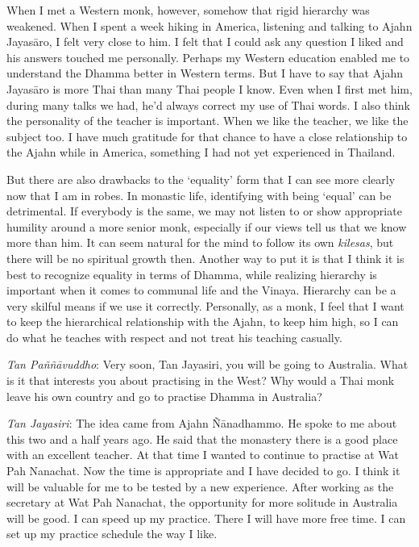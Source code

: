 When I met a Western monk, however, somehow that rigid hierarchy was
weakened. When I spent a week hiking in America, listening and talking
to Ajahn Jayasāro, I felt very close to him. I felt that I could ask any
question I liked and his answers touched me personally. Perhaps my
Western education enabled me to understand the Dhamma better in Western
terms. But I have to say that Ajahn Jayasāro is more Thai than many Thai
people I know. Even when I first met him, during many talks we had, he'd
always correct my use of Thai words. I also think the personality of the
teacher is important. When we like the teacher, we like the subject too.
I have much gratitude for that chance to have a close relationship to
the Ajahn while in America, something I had not yet experienced in
Thailand.

But there are also drawbacks to the `equality' form that I can see more
clearly now that I am in robes. In monastic life, identifying with being
`equal' can be detrimental. If everybody is the same, we may not listen
to or show appropriate humility around a more senior monk, especially if
our views tell us that we know more than him. It can seem natural for
the mind to follow its own \emph{kilesas}, but there will be no
spiritual growth then. Another way to put it is that I think it is best
to recognize equality in terms of Dhamma, while realizing hierarchy is
important when it comes to communal life and the Vinaya. Hierarchy can
be a very skilful means if we use it correctly. Personally, as a monk, I
feel that I want to keep the hierarchical relationship with the Ajahn,
to keep him high, so I can do what he teaches with respect and not treat
his teaching casually.

\emph{Tan Paññāvuddho}‎: Very soon, Tan Jayasiri, you will be going to
Australia. What is it that interests you about practising in the West?
Why would a Thai monk leave his own country and go to practise Dhamma in
Australia?

\emph{Tan Jayasiri}: The idea came from Ajahn Ñānadhammo. He spoke to me
about this two and a half years ago. He said that the monastery there is
a good place with an excellent teacher. At that time I wanted to
continue to practise at Wat Pah Nanachat. Now the time is appropriate
and I have decided to go. I think it will be valuable for me to be
tested by a new experience. After working as the secretary at Wat Pah
Nanachat, the opportunity for more solitude in Australia will be good. I
can speed up my practice. There I will have more free time. I can set up
my practice schedule the way I like.

